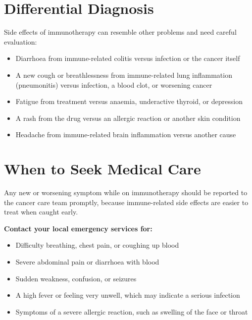 \section*{Differential Diagnosis}
Side effects of immunotherapy can resemble other problems and need careful evaluation:
\begin{itemize}
    \item Diarrhoea from immune-related colitis versus infection or the cancer itself
    \item A new cough or breathlessness from immune-related lung inflammation (pneumonitis) versus infection, a blood clot, or worsening cancer
    \item Fatigue from treatment versus anaemia, underactive thyroid, or depression
    \item A rash from the drug versus an allergic reaction or another skin condition
    \item Headache from immune-related brain inflammation versus another cause
\end{itemize}

\section*{When to Seek Medical Care}
Any new or worsening symptom while on immunotherapy should be reported to the cancer care team promptly, because immune-related side effects are easier to treat when caught early.

\textbf{Contact your local emergency services for:}
\begin{itemize}
    \item Difficulty breathing, chest pain, or coughing up blood
    \item Severe abdominal pain or diarrhoea with blood
    \item Sudden weakness, confusion, or seizures
    \item A high fever or feeling very unwell, which may indicate a serious infection
    \item Symptoms of a severe allergic reaction, such as swelling of the face or throat
\end{itemize}

